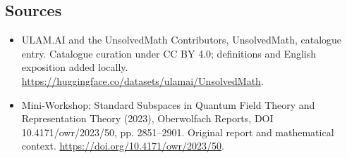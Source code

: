 \documentclass[11pt]{article}
\begin{document}
\subsection{Sources}
\begin{itemize}
\item[\hypertarget{source:statement:1}{S1}] ULAM.AI and the UnsolvedMath Contributors, UnsolvedMath, catalogue entry. Catalogue curation under CC BY 4.0; definitions and English exposition added locally.
\url{https://huggingface.co/datasets/ulamai/UnsolvedMath}.
\item[\hypertarget{source:statement:2}{S2}] Mini-Workshop: Standard Subspaces in Quantum Field Theory and Representation Theory (2023), Oberwolfach Reports, DOI 10.4171/owr/2023/50, pp. 2851--2901. Original report and mathematical context.
\url{https://doi.org/10.4171/owr/2023/50}.
\end{itemize}
\label{end:statement}
\end{document}
